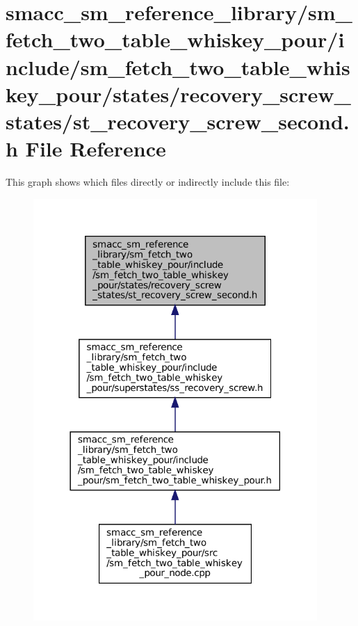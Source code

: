 \hypertarget{sm__fetch__two__table__whiskey__pour_2include_2sm__fetch__two__table__whiskey__pour_2states_2rec4a8c38d37b28bc144e8c3cf17db2412c}{}\section{smacc\+\_\+sm\+\_\+reference\+\_\+library/sm\+\_\+fetch\+\_\+two\+\_\+table\+\_\+whiskey\+\_\+pour/include/sm\+\_\+fetch\+\_\+two\+\_\+table\+\_\+whiskey\+\_\+pour/states/recovery\+\_\+screw\+\_\+states/st\+\_\+recovery\+\_\+screw\+\_\+second.h File Reference}
\label{sm__fetch__two__table__whiskey__pour_2include_2sm__fetch__two__table__whiskey__pour_2states_2rec4a8c38d37b28bc144e8c3cf17db2412c}
This graph shows which files directly or indirectly include this file\+:
\nopagebreak
\begin{figure}[H]
\begin{center}
\leavevmode
\includegraphics[width=306pt]{sm__fetch__two__table__whiskey__pour_2include_2sm__fetch__two__table__whiskey__pour_2states_2rec46a73b158d15fd1e58a12bcc89fa5d4f}
\end{center}
\end{figure}
